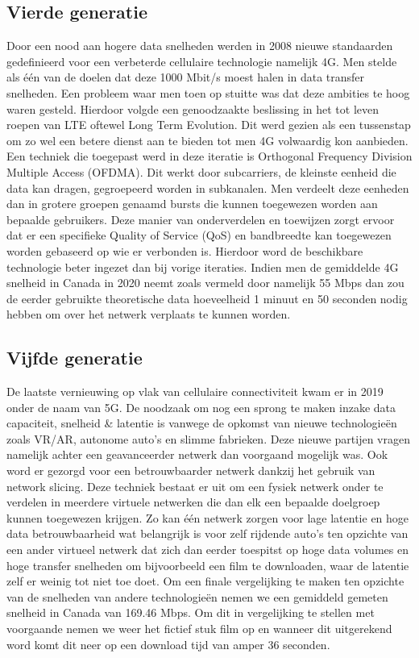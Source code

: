 \subsection{Vierde generatie}

Door een nood aan hogere data snelheden werden in 2008 nieuwe standaarden gedefinieerd voor een verbeterde cellulaire technologie namelijk 4G. Men stelde als één van de doelen dat deze 1000 Mbit/s moest halen in data transfer snelheden. Een probleem waar men toen op stuitte was dat deze ambities te hoog waren gesteld. Hierdoor volgde een genoodzaakte beslissing in het tot leven roepen van LTE oftewel Long Term Evolution. Dit werd gezien als een tussenstap om zo wel een betere dienst aan te bieden tot men 4G volwaardig kon aanbieden. \autocite{Nicholls2022} Een techniek die toegepast werd in deze iteratie is Orthogonal Frequency Division Multiple Access (OFDMA). Dit werkt door subcarriers, de kleinste eenheid die data kan dragen, gegroepeerd worden in subkanalen. Men verdeelt deze eenheden dan in grotere groepen genaamd bursts die kunnen toegewezen worden aan bepaalde gebruikers. Deze manier van onderverdelen en toewijzen zorgt ervoor dat er een specifieke Quality of Service (QoS) en bandbreedte kan toegewezen worden gebaseerd op wie er verbonden is. Hierdoor word de beschikbare technologie beter ingezet dan bij vorige iteraties. \autocite{Friedmann2007} Indien men de gemiddelde 4G snelheid in Canada in 2020 neemt zoals vermeld door \textcite{Galazzo2020} namelijk 55 Mbps dan zou de eerder gebruikte theoretische data hoeveelheid 1 minuut en 50 seconden nodig hebben om over het netwerk verplaats te kunnen worden. \autocite{Wooding2024}

\subsection{Vijfde generatie}

De laatste vernieuwing op vlak van cellulaire connectiviteit kwam er in 2019 onder de naam van 5G. De noodzaak om nog een sprong te maken inzake data capaciteit, snelheid \& latentie is vanwege de opkomst van nieuwe technologieën zoals VR/AR, autonome auto's en slimme fabrieken. Deze nieuwe partijen vragen namelijk achter een geavanceerder netwerk dan voorgaand mogelijk was. Ook word er gezorgd voor een betrouwbaarder netwerk dankzij het gebruik van network slicing. Deze techniek bestaat er uit om een fysiek netwerk onder te verdelen in meerdere virtuele netwerken die dan elk een bepaalde doelgroep kunnen toegewezen krijgen. Zo kan één netwerk zorgen voor lage latentie en hoge data betrouwbaarheid wat belangrijk is voor zelf rijdende auto's ten opzichte van een ander virtueel netwerk dat zich dan eerder toespitst op hoge data volumes en hoge transfer snelheden om bijvoorbeeld een film te downloaden, waar de latentie zelf er weinig tot niet toe doet. \autocite{Flinders2024} Om een finale vergelijking te maken ten opzichte van de snelheden van andere technologieën nemen we een gemiddeld gemeten snelheid in Canada van 169.46 Mbps. \autocite{Galazzo2020} Om dit in vergelijking te stellen met voorgaande nemen we weer het fictief stuk film op en wanneer dit uitgerekend word komt dit neer op een download tijd van amper 36 seconden. \autocite{Wooding2024}

